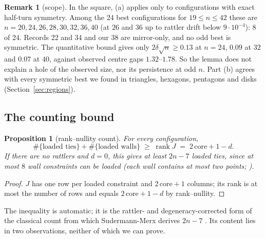 \documentclass[11pt]{amsart}
\newtheorem{proposition}[theorem]{Proposition}
\theoremstyle{definition}
\newtheorem{remark}[theorem]{Remark}
\newcommand{\core}{\mathrm{core}}
\begin{document}
\begin{remark}[scope]
In the square, (a) applies only to configurations with exact half-turn symmetry. Among the 24 best configurations for $19 \le n \le 42$ these are $n = 20, 24, 26, 28, 30, 32, 36, 40$ (at $26$ and $36$ up to rattler drift below $9\cdot10^{-4}$): 8 of 24. Records 22 and 34 and our 38 are mirror-only, and no odd best is symmetric. %
The quantitative bound gives only $2\delta\sqrt n \ge 0.13$ at $n = 24$, $0.09$ at $32$ and $0.07$ at $40$, against observed centre gaps $1.32$--$1.78$. %
So the lemma does not explain a hole of the observed size, nor its persistence at odd $n$. Part (b) agrees with every symmetric best we found in triangles, hexagons, pentagons and disks (Section~\ref{sec:regions}). %
\end{remark}

\subsection{The counting bound}

\begin{proposition}[rank--nullity count]\label{prop:dof}
For every configuration,
\[
  \#\{\text{loaded ties}\} + \#\{\text{loaded walls}\} \;\ge\; \operatorname{rank} J \;=\; 2\,\core + 1 - d .
\]
If there are no rattlers and $d = 0$, this gives at least $2n-7$ loaded ties, since at most $8$ wall constraints can be loaded (each wall contains at most two points; \cite{SM,Trela}).
\end{proposition}

\begin{proof}
$J$ has one row per loaded constraint and $2\,\core + 1$ columns; its rank is at most the number of rows and equals $2\,\core+1-d$ by rank--nullity.
\end{proof}

The inequality is automatic; it is the rattler- and degeneracy-corrected form of the classical count \cite{CGSY} from which Sudermann-Merx derives $2n-7$ \cite[Sec.~7.1]{SM}. %
Its content lies in two observations, neither of which we can prove.
\end{document}
